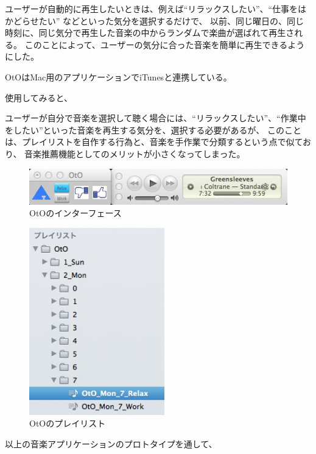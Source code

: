 \documentclass[11pt, onecolumn]{jsarticle}
\begin{document}
ユーザーが自動的に再生したいときは、例えば``リラックスしたい''、``仕事をはかどらせたい''
などといった気分を選択するだけで、
以前、同じ曜日の、同じ時刻に、同じ気分で再生した音楽の中からランダムで楽曲が選ばれて再生される。
このことによって、ユーザーの気分に合った音楽を簡単に再生できるようにした。

OtOはMac用のアプリケーションでiTunesと連携している。

使用してみると、

ユーザーが自分で音楽を選択して聴く場合には、``リラックスしたい''、``作業中をしたい''といった音楽を再生する気分を、選択する必要があるが、
このことは、プレイリストを自作する行為と、音楽を手作業で分類するという点で似ており、
音楽推薦機能としてのメリットが小さくなってしまった。

\begin{figure}[h]
\begin{center}
\includegraphics[width=14cm]{OtO_imageView.jpg}
\caption{OtOのインターフェース}
\label{OtO_interface}
\end{center}
\end{figure}

\begin{figure}[h]
\begin{center}
\includegraphics[width=5.866cm]{OtO_playList.jpg}
\caption{OtOのプレイリスト}
\label{OtO_playlist}
\end{center}
\end{figure}


以上の音楽アプリケーションのプロトタイプを通して、
\end{document}
